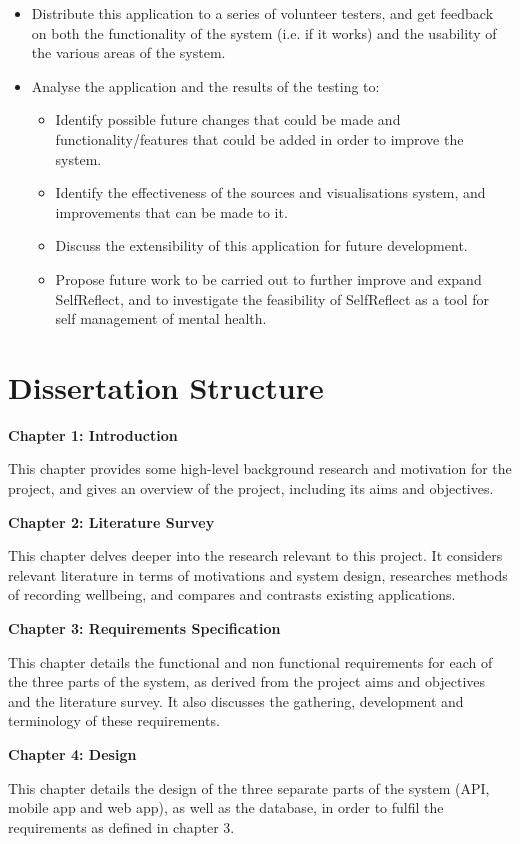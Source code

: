 \documentclass[11pt,openright,a4paper]{report}
\begin{document}
\begin{itemize}
\item Distribute this application to a series of volunteer testers, and get feedback on both the functionality of the system (i.e. if it works) and the usability of the various areas of the system.
\item Analyse the application and the results of the testing to:
\begin{itemize}
  \item Identify possible future changes that could be made and functionality/features that could be added in order to improve the system.
  \item Identify the effectiveness of the sources and visualisations system, and improvements that can be made to it.
  \item Discuss the extensibility of this application for future development.
  \item Propose future work to be carried out to further improve and expand SelfReflect, and to investigate the feasibility of SelfReflect as a tool for self management of mental health.
\end{itemize}

\end{itemize}

\section{Dissertation Structure}
\textbf{Chapter 1: Introduction}

This chapter provides some high-level background research and motivation for the project, and gives an overview of the project, including its aims and objectives.

\textbf{Chapter 2: Literature Survey}

This chapter delves deeper into the research relevant to this project. It considers relevant literature in terms of motivations and system design, researches methods of recording wellbeing, and compares and contrasts existing applications.

\textbf{Chapter 3: Requirements Specification}

This chapter details the functional and non functional requirements for each of the three parts of the system, as derived from the project aims and objectives and the literature survey. It also discusses the gathering, development and terminology of these requirements.

\textbf{Chapter 4: Design}

This chapter details the design of the three separate parts of the system (API, mobile app and web app), as well as the database, in order to fulfil the requirements as defined in chapter 3.
\end{document}
